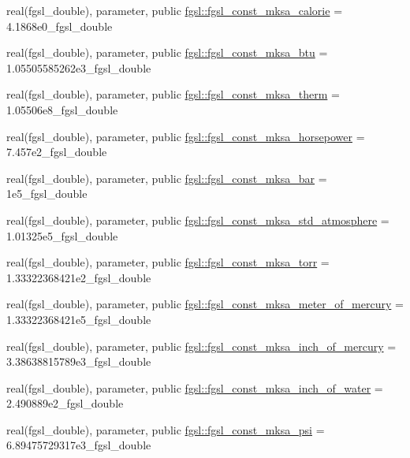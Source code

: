 \begin{DoxyCompactItemize}
\item 
real(fgsl\+\_\+double), parameter, public \hyperlink{namespacefgsl_acb71a08b4387dc29400805067d9aa6ec}{fgsl\+::fgsl\+\_\+const\+\_\+mksa\+\_\+calorie} = 4.\+1868e0\+\_\+fgsl\+\_\+double
\item 
real(fgsl\+\_\+double), parameter, public \hyperlink{namespacefgsl_a868742553429b50b469d7d21a481cc66}{fgsl\+::fgsl\+\_\+const\+\_\+mksa\+\_\+btu} = 1.\+05505585262e3\+\_\+fgsl\+\_\+double
\item 
real(fgsl\+\_\+double), parameter, public \hyperlink{namespacefgsl_ae80985230902a792be876b10eac1a358}{fgsl\+::fgsl\+\_\+const\+\_\+mksa\+\_\+therm} = 1.\+05506e8\+\_\+fgsl\+\_\+double
\item 
real(fgsl\+\_\+double), parameter, public \hyperlink{namespacefgsl_af97c5cddea274909ba83c36dc36e90a3}{fgsl\+::fgsl\+\_\+const\+\_\+mksa\+\_\+horsepower} = 7.\+457e2\+\_\+fgsl\+\_\+double
\item 
real(fgsl\+\_\+double), parameter, public \hyperlink{namespacefgsl_a218481ee71a34d944cbc21affd61bc8a}{fgsl\+::fgsl\+\_\+const\+\_\+mksa\+\_\+bar} = 1e5\+\_\+fgsl\+\_\+double
\item 
real(fgsl\+\_\+double), parameter, public \hyperlink{namespacefgsl_ae2440545adbbcd420b11d8e12db0a681}{fgsl\+::fgsl\+\_\+const\+\_\+mksa\+\_\+std\+\_\+atmosphere} = 1.\+01325e5\+\_\+fgsl\+\_\+double
\item 
real(fgsl\+\_\+double), parameter, public \hyperlink{namespacefgsl_aba0c7c1da846e36ceea84cec02bb6478}{fgsl\+::fgsl\+\_\+const\+\_\+mksa\+\_\+torr} = 1.\+33322368421e2\+\_\+fgsl\+\_\+double
\item 
real(fgsl\+\_\+double), parameter, public \hyperlink{namespacefgsl_a7f5943b971d1e27da66ed35eb36865a0}{fgsl\+::fgsl\+\_\+const\+\_\+mksa\+\_\+meter\+\_\+of\+\_\+mercury} = 1.\+33322368421e5\+\_\+fgsl\+\_\+double
\item 
real(fgsl\+\_\+double), parameter, public \hyperlink{namespacefgsl_a66f697c831591659ce7e9305e7c18c46}{fgsl\+::fgsl\+\_\+const\+\_\+mksa\+\_\+inch\+\_\+of\+\_\+mercury} = 3.\+38638815789e3\+\_\+fgsl\+\_\+double
\item 
real(fgsl\+\_\+double), parameter, public \hyperlink{namespacefgsl_afdebd41de62af9d5a4b9ed6efcf9cea2}{fgsl\+::fgsl\+\_\+const\+\_\+mksa\+\_\+inch\+\_\+of\+\_\+water} = 2.\+490889e2\+\_\+fgsl\+\_\+double
\item 
real(fgsl\+\_\+double), parameter, public \hyperlink{namespacefgsl_af1bb05c944f3cc7eca8c2ffb562c1cfe}{fgsl\+::fgsl\+\_\+const\+\_\+mksa\+\_\+psi} = 6.\+89475729317e3\+\_\+fgsl\+\_\+double

\end{DoxyCompactItemize}
